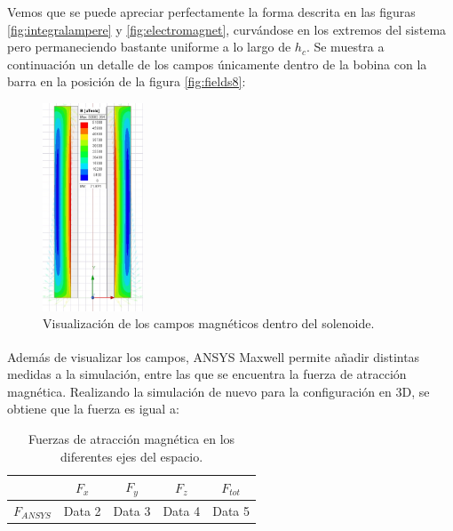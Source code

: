 Vemos que se puede apreciar perfectamente la forma descrita en las figuras \ref{fig:integralampere} y \ref{fig:electromagnet}, curvándose en los extremos del sistema pero permaneciendo bastante uniforme a lo largo de \(h_c\). Se muestra a continuación un detalle de los campos únicamente dentro de la bobina con la barra en la posición de la figura \ref{fig:fields8}:

\begin{figure}[H]
    \centering
    \includegraphics[width=3cm]{FigurasMemoria/fieldsDetail.jpg}
    \caption{Visualización de los campos magnéticos dentro del solenoide.}
    \label{fig:fieldsDetail} %
\end{figure}

Además de visualizar los campos, ANSYS Maxwell\textsuperscript{\textregistered} permite añadir distintas medidas a la simulación, entre las que se encuentra la fuerza de atracción magnética. Realizando la simulación de nuevo para la configuración en 3D, se obtiene que la fuerza es igual a:

\begin{table}[h]
    \centering
    \begin{tabular}{|c|c|c|c|c|}
        \hline
        & \(F_x\) & \(F_y\) & \(F_z\) & \(F_{tot}\) \\
        \hline
        \(F_{ANSYS}\) & Data 2 & Data 3 & Data 4 & Data 5 \\
        \hline
    \end{tabular}
    \caption{Fuerzas de atracción magnética en los diferentes ejes del espacio.}
    \label{tab:fuerzas}
\end{table}

